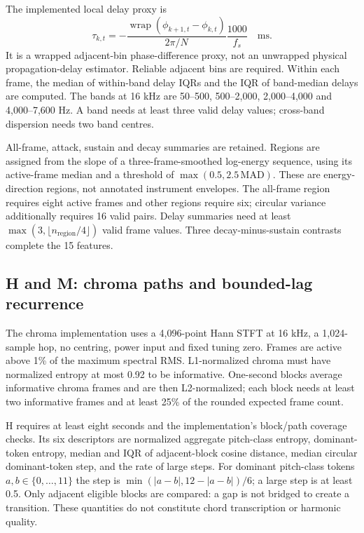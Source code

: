 The implemented local delay proxy is
\begin{equation}
 \tau_{k,t}=-\frac{\operatorname{wrap}(\phi_{k+1,t}-\phi_{k,t})}
                         {2\pi/N}\frac{1000}{f_s}\quad\text{ms}.
\end{equation}
It is a wrapped adjacent-bin phase-difference proxy, not an unwrapped
physical propagation-delay estimator. Reliable adjacent bins are required.
Within each frame, the median of within-band delay IQRs and the IQR of
band-median delays are computed. The bands at 16 kHz are 50--500,
500--2,000, 2,000--4,000 and 4,000--7,600 Hz. A band needs at least three
valid delay values; cross-band dispersion needs two band centres.

All-frame, attack, sustain and decay summaries are retained. Regions are
assigned from the slope of a three-frame-smoothed log-energy sequence,
using its active-frame median and a threshold of
$\max(0.5,2.5\,\mathrm{MAD})$. These are energy-direction regions, not
annotated instrument envelopes. The all-frame region requires eight active
frames and other regions require six; circular variance additionally
requires 16 valid pairs. Delay summaries need at least
$\max(3,\lfloor n_{\mathrm{region}}/4\rfloor)$ valid frame values.
Three decay-minus-sustain contrasts complete the 15 features.

\subsection{H and M: chroma paths and bounded-lag recurrence}
The chroma implementation uses a 4,096-point Hann STFT at 16 kHz, a
1,024-sample hop, no centring, power input and fixed tuning zero. Frames
are active above 1\% of the maximum spectral RMS. L1-normalized chroma
must have normalized entropy at most 0.92 to be informative. One-second
blocks average informative chroma frames and are then L2-normalized;
each block needs at least two informative frames and at least 25\% of the
rounded expected frame count.

H requires at least eight seconds and the implementation's block/path
coverage checks. Its six descriptors are normalized aggregate pitch-class
entropy, dominant-token entropy, median and IQR of adjacent-block cosine
distance, median circular dominant-token step, and the rate of large steps.
For dominant pitch-class tokens $a,b\in\{0,\ldots,11\}$ the step is
$\min(|a-b|,12-|a-b|)/6$; a large step is at least 0.5. Only adjacent
eligible blocks are compared: a gap is not bridged to create a transition.
These quantities do not constitute chord transcription or harmonic quality.

